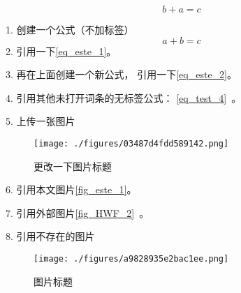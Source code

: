 

\begin{equation}\label{eq_este_2}
b + a = c
\end{equation}

1. 创建一个公式（不加标签）
\begin{equation}\label{eq_este_1}
a + b = c
\end{equation}
2. 引用一下\autoref{eq_este_1}。

3. 再在上面创建一个新公式， 引用一下\autoref{eq_este_2}。

4. 引用其他未打开词条的无标签公式： \autoref{eq_test_4}~。

5. 上传一张图片
\begin{figure}[ht]
\centering
\texttt{[image: ./figures/03487d4fdd589142.png]}
\caption{更改一下图片标题} \label{fig_este_1}
\end{figure}
6. 引用本文图片\autoref{fig_este_1}。

7. 引用外部图片\autoref{fig_HWF_2}~。

8. 引用不存在的图片

\begin{figure}[ht]
\centering
\texttt{[image: ./figures/a9828935e2bac1ee.png]}
\caption{图片标题} \label{fig_este_2}
\end{figure}
